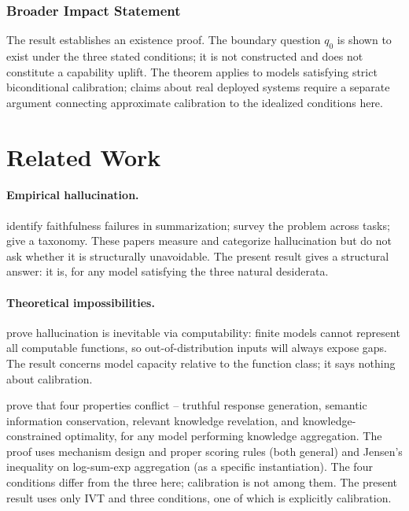 \documentclass[10pt]{article}
\begin{document}
\subsubsection*{Broader Impact Statement}
The result establishes an existence proof. The boundary question $q_0$
is shown to exist under the three stated conditions; it is not
constructed and does not constitute a capability uplift. The theorem
applies to models satisfying strict biconditional calibration; claims
about real deployed systems require a separate argument connecting
approximate calibration to the idealized conditions here.

\section{Related Work}
\label{sec:related}

\paragraph{Empirical hallucination.}
\citet{maynez2020faithfulness} identify faithfulness failures in
summarization; \citet{ji2023survey} survey the problem across tasks;
\citet{zhang2023siren} give a taxonomy. These papers measure and
categorize hallucination but do not ask whether it is structurally
unavoidable. The present result gives a structural answer: it is, for
any model satisfying the three natural desiderata.

\paragraph{Theoretical impossibilities.}
\citet{xu2024hallucination} prove hallucination is inevitable via
computability: finite models cannot represent all computable functions,
so out-of-distribution inputs will always expose gaps. The result
concerns model capacity relative to the function class; it says nothing
about calibration.

\citet{karpowicz2025impossibility} prove that four properties conflict --
truthful response generation, semantic information conservation, relevant
knowledge revelation, and knowledge-constrained optimality, for any
model performing knowledge aggregation. The proof uses mechanism design
and proper scoring rules (both general) and Jensen's inequality on
log-sum-exp aggregation (as a specific instantiation). The four conditions
differ from the three here; calibration is not among them. The present
result uses only IVT and three conditions, one of which is explicitly
calibration.
\end{document}
